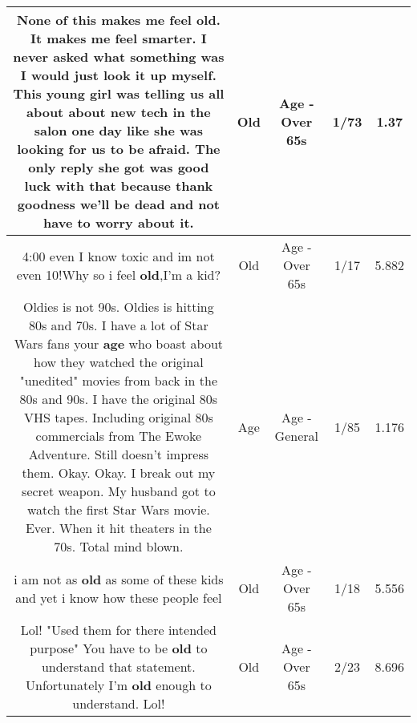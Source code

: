 \documentclass[11pt]{article}
\newlength\mylength
\begin{document}
\begin{center}
\begin{longtable}{|C{.65\mylength}|C{.30\mylength}|C{.12\mylength}|C{.12\mylength}|C{.12\mylength}|}
  \small None of this makes me feel \textbf{old}. It makes me feel smarter. I never asked what something was I would just look it up myself. This young girl was telling us all about about new tech in the salon one day like she was looking for us to be afraid. The only reply she got was good luck with that because thank goodness we'll be dead and not have to worry about it.\normalsize   & Old & Age - Over 65s & 1/73 & 1.37 \\  \hline
  \small 4:00 even I know toxic and im not even 10!Why so i feel \textbf{old},I'm a kid?\normalsize   & Old & Age - Over 65s & 1/17 & 5.882 \\  \hline
  \small Oldies is not 90s. Oldies is hitting 80s and 70s. I have a lot of Star Wars fans your \textbf{age} who boast about how they watched the original "unedited" movies from back in the 80s and 90s. I have the original 80s VHS tapes. Including original 80s commercials from The Ewoke Adventure. Still doesn't impress them. Okay. Okay. I break out my secret weapon. My husband got to watch the first Star Wars movie. Ever. When it hit theaters in the 70s. Total mind blown.\normalsize   & Age & Age - General & 1/85 & 1.176 \\  \hline
  \small i am not as \textbf{old} as some of these kids and yet i know how these people feel\normalsize   & Old & Age - Over 65s & 1/18 & 5.556 \\  \hline
  \small Lol! "Used them for there intended purpose" You have to be \textbf{old} to understand that statement. Unfortunately I'm \textbf{old} enough to understand. Lol!\normalsize   & Old & Age - Over 65s & 2/23 & 8.696 \\  \hline

\end{longtable}
\end{center}
\end{document}
